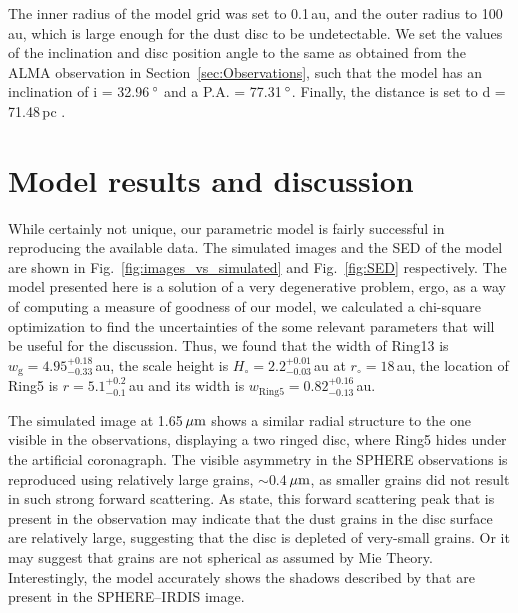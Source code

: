 \documentclass[fleqn,usenatbib,useAMS]{mnras}
\begin{document}
The inner radius of the model grid was set to 0.1\,au, and the outer radius to 100\,au, which is large enough for the dust disc to be undetectable. We set the values of the inclination and disc position angle to the same as obtained from the ALMA observation in Section~\ref{sec:Observations}, such that the model has an inclination of i = 32.96\,$\hbox{$^\circ$}$ and a P.A. = 77.31\,$\hbox{$^\circ$}$. Finally, the distance is set to d = 71.48\,pc \citep{gaiacollaboration2020gaia}.

\section{Model results and discussion} \label{sec:results}

While certainly not unique, our parametric model is fairly successful in reproducing the available data. The simulated images and the SED of the model are shown in Fig.~\ref{fig:images_vs_simulated} and Fig.~\ref{fig:SED} respectively. The model presented here is a solution of a very degenerative problem, ergo, as a way of computing a measure of goodness of our model, we calculated a chi-square optimization to find the uncertainties of the some relevant parameters that will be useful for the discussion. Thus, we found that the width of Ring13 is $w_\mathrm{g} = 4.95^{+0.18}_{-0.33}$\,au, the scale height is $H_\circ = 2.2^{+0.01}_{-0.03}$\,au at $r_\circ = 18$\,au, the location of Ring5 is $r=5.1^{+0.2}_{-0.1}$\,au and its width is $w_\mathrm{Ring5} = 0.82^{+0.16}_{-0.13}$\,au.

The simulated image at 1.65\,$\hbox{$\mu$m}$ shows a similar radial structure to the one visible in the observations, displaying a two ringed disc, where Ring5 hides under the artificial coronagraph. The visible asymmetry in the SPHERE observations is reproduced using relatively large grains, $\sim$0.4\,$\hbox{$\mu$m}$, as smaller grains did not result in such strong forward scattering. As \citet{refId0} state, this forward scattering peak that is present in the observation may indicate that the dust grains in the disc surface are relatively large, suggesting that the disc is depleted of very-small grains. Or it may suggest that grains are not spherical as assumed by Mie Theory. Interestingly, the model accurately shows the shadows described by \citet{dOrazi} that are present in the SPHERE--IRDIS image.  
\end{document}
